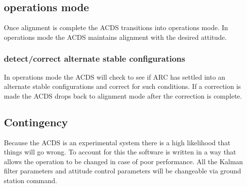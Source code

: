 \subsection{operations mode}

Once alignment is complete the \ac{ACDS} transitions into operations mode. In operations mode the \ac{ACDS} maintains alignment with the desired attitude.

\subsubsection{detect/correct alternate stable configurations}

In operations mode the \ac{ACDS} will check to see if \ac{ARC} has settled into an alternate stable configurations and correct for such conditions. If a correction is made the \ac{ACDS} drops back to alignment mode after the correction is complete.

\subsection{Contingency}

Because the \ac{ACDS} is an experimental system there is a high likelihood that things will go wrong. To account for this the software is written in a way that allows the operation to be changed in case of poor performance. All the Kalman filter parameters and attitude control parameters will be changeable via ground station command.



